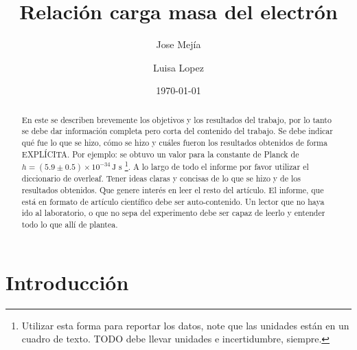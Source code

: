 \documentclass[a4paper, amsfonts, amssymb, amsmath, reprint, showkeys, nofootinbib, twoside]{revtex4-1}
\begin{document}
\title{Relación carga masa del electrón}


\author{Jose Mejía}

\author{Luisa Lopez}
  


\date{\today} %

\begin{abstract}

En este se describen brevemente los objetivos y los resultados del trabajo, por lo tanto se debe dar información completa pero corta del contenido del trabajo. Se debe indicar qué fue lo que se hizo, cómo se hizo y cuáles fueron los resultados obtenidos de forma EXPLÍCITA. Por ejemplo: se obtuvo un valor para la constante de Planck de $h=(5.9\pm 0.5)\times 10^{-34}\,\text{J s}$ \footnote{Utilizar esta forma para reportar los datos, note que las unidades están en un cuadro de texto. TODO debe llevar unidades e incertidumbre, siempre.}. A lo largo de todo el informe por favor utilizar el diccionario de overleaf. Tener ideas claras y concisas de lo que se hizo y de los resultados obtenidos. Que genere interés en leer el resto del artículo. El informe, que está en formato de artículo científico debe ser auto-contenido. Un lector que no haya ido al laboratorio, o que no sepa del experimento debe ser capaz de leerlo y entender todo lo que allí de plantea.

\end{abstract}

\maketitle

\section{Introducción}
\end{document}
